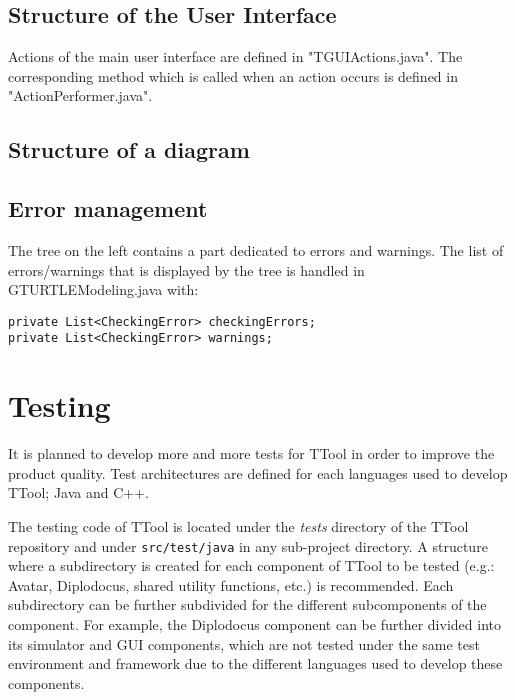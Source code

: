 \documentclass[12pt]{article}
\begin{document}
\subsection{Structure of the User Interface}
Actions of the main user interface are defined in "TGUIActions.java". The corresponding method which is called when an action occurs is defined in "ActionPerformer.java".

\subsection{Structure of a diagram}


\subsection{Error management}
The tree on the left contains a part dedicated to errors and warnings. The list of errors/warnings that is displayed by the tree is handled in GTURTLEModeling.java with:
\begin{lstlisting}
private List<CheckingError> checkingErrors;
private List<CheckingError> warnings;
\end{lstlisting}

\newpage

\section{Testing}

It is planned to develop more and more tests for TTool in order to improve the
product quality. Test architectures are defined for each languages used to
develop TTool; Java and C++.

The testing code of TTool is located under the \textit{tests} directory of the TTool
repository and under \texttt{src/test/java} in any sub-project directory. A structure where a subdirectory is created for each
component of TTool to be tested (e.g.: Avatar, Diplodocus, shared utility
functions, etc.) is recommended. Each subdirectory can be further subdivided for
the different subcomponents of the component. For example, the Diplodocus component can be
further divided into its simulator and GUI components, which are not tested
under the same test environment and framework due to the different languages
used to develop these components.

\end{document}
